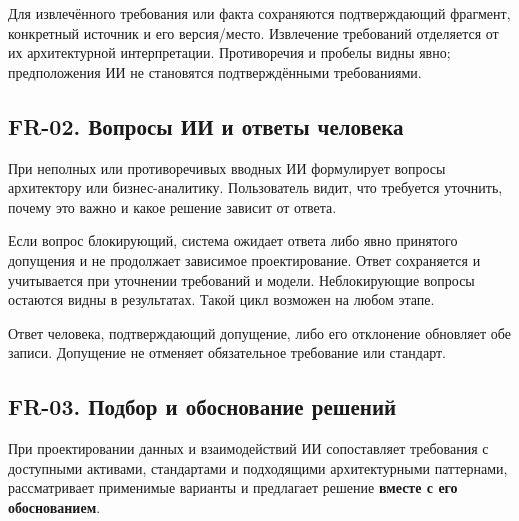\documentclass[10pt,a4paper]{article}
\begin{document}
Для извлечённого требования или факта сохраняются подтверждающий фрагмент, конкретный источник и его версия/место. Извлечение требований отделяется от их архитектурной интерпретации. Противоречия и пробелы видны явно; предположения ИИ не становятся подтверждёнными требованиями.

\subsection{FR-02. Вопросы ИИ и ответы человека}\label{fr-02-ux432ux43eux43fux440ux43eux441ux44b-ux438ux438-ux438-ux43eux442ux432ux435ux442ux44b-ux447ux435ux43bux43eux432ux435ux43aux430}

При неполных или противоречивых вводных ИИ формулирует вопросы архитектору или бизнес-аналитику. Пользователь видит, что требуется уточнить, почему это важно и какое решение зависит от ответа.

Если вопрос блокирующий, система ожидает ответа либо явно принятого допущения и не продолжает зависимое проектирование. Ответ сохраняется и учитывается при уточнении требований и модели. Неблокирующие вопросы остаются видны в результатах. Такой цикл возможен на любом этапе.


Ответ человека, подтверждающий допущение, либо его отклонение обновляет обе записи. Допущение не отменяет обязательное требование или стандарт.

\subsection{FR-03. Подбор и обоснование решений}\label{fr-03-ux43fux43eux434ux431ux43eux440-ux438-ux43eux431ux43eux441ux43dux43eux432ux430ux43dux438ux435-ux440ux435ux448ux435ux43dux438ux439}

При проектировании данных и взаимодействий ИИ сопоставляет требования с доступными активами, стандартами и подходящими архитектурными паттернами, рассматривает применимые варианты и предлагает решение \textbf{вместе с его обоснованием}.
\end{document}
